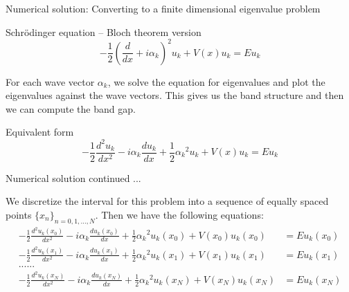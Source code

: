 \documentclass{beamer}
\begin{document}
\begin{frame}{Numerical solution: Converting to a finite dimensional eigenvalue problem}
    \begin{block}{Schr\"{o}dinger equation -- Bloch theorem version}
   \begin{equation}\label{eq:2.2bloch}
-\frac{1}{2}(\frac{d}{dx}+i\alpha_k)^2u_k+V(x)u_k = Eu_k
\end{equation}
\end{block}
For each wave vector $\alpha_k$, we solve the equation for eigenvalues and plot the eigenvalues against the wave vectors. This gives us the band structure and then we can compute the band gap.  

    \begin{block}{Equivalent form}
   \begin{equation}\label{eq:expand}
-\frac{1}{2}\frac{d^2u_k}{dx^2}-i\alpha_k \frac{d u_k}{dx} +\frac{1}{2}{\alpha_k}^2u_k+V(x)u_k = Eu_k
\end{equation}
\end{block}

\end{frame}

\begin{frame}{Numerical solution continued ...}

We discretize the interval for this problem into a sequence of equally spaced points $\{x_n\}_{n = 0,1,...,N}$. Then we have the following equations:
\begin{align*} 
 -\frac{1}{2}\frac{d^2u_k(x_0)}{dx^2}-i\alpha_k \frac{d u_k(x_0)}{dx} +\frac{1}{2}{\alpha_k}^2u_k(x_0)+V(x_0)u_k(x_0)  &= Eu_k(x_0)  \\
  -\frac{1}{2}\frac{d^2u_k(x_1)}{dx^2}-i\alpha_k \frac{d u_k(x_1)}{dx} +\frac{1}{2}{\alpha_k}^2u_k(x_1)+V(x_1)u_k(x_1)  &= Eu_k(x_1) \\
......\\
 -\frac{1}{2}\frac{d^2u_k(x_N)}{dx^2}-i\alpha_k \frac{d u_k(x_N)}{dx} +\frac{1}{2}{\alpha_k}^2u_k(x_N)+V(x_N)u_k(x_N)  &= Eu_k(x_N) \\
\end{align*}
\end{frame}
\end{document}
